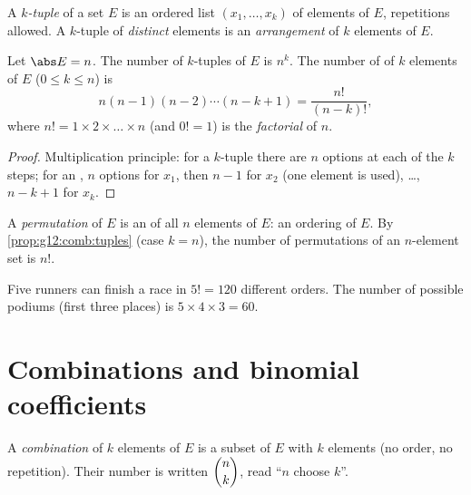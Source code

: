 \begin{definition}[$k$-tuples]\label{def:g12:comb:tuples}
A \emph{$k$-tuple} of a set $E$ is an ordered list $(x_1, \dots, x_k)$ of
elements of $E$, repetitions allowed. A $k$-tuple of \emph{distinct}
elements is an \emph{arrangement} of $k$ elements of $E$.
\end{definition}

\begin{proposition}\label{prop:g12:comb:tuples}
Let $\abs E = n$. The number of $k$-tuples of $E$ is $n^k$. The number of
 of $k$ elements of $E$ ($0 \leq k \leq n$) is
\[
n(n-1)(n-2)\cdots(n-k+1) = \frac{n!}{(n-k)!},
\]
where $n! = 1 \times 2 \times \dots \times n$ (and $0! = 1$) is the
\emph{factorial} of $n$.
\end{proposition}

\begin{proof}
Multiplication principle: for a $k$-tuple there are $n$ options at each of
the $k$ steps; for an , $n$ options for $x_1$, then $n - 1$ for
$x_2$ (one element is used), \dots, $n - k + 1$ for $x_k$.
\end{proof}

\begin{definition}[Permutation]\label{def:g12:comb:permutation}
A \emph{permutation} of $E$ is an  of all $n$
elements of $E$: an ordering of $E$. By
\cref{prop:g12:comb:tuples} (case $k = n$), the number of permutations of an
$n$-element set is $n!$.
\end{definition}

\begin{example}
Five runners can finish a race in $5! = 120$ different orders. The number of
possible podiums (first three places) is $5 \times 4 \times 3 = 60$.
\end{example}

\section{Combinations and binomial coefficients}

\begin{definition}[Combinations]\label{def:g12:comb:combination}
A \emph{combination} of $k$ elements of $E$ is a subset
of $E$ with $k$ elements (no order, no repetition). Their number is written
$\dbinom{n}{k}$, read ``$n$ choose $k$''.
\end{definition}


